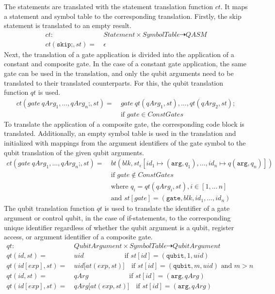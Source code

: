 The statements are translated with the statement translation function $ct$. It maps a statement and symbol table to the corresponding translation. Firstly, the skip statement is translated to an empty result.
\begin{align*}
    ct : \ & Statement \times SymbolTable \dashrightarrow QASM\\
    ct(\texttt{skip;}, st) = \ & \epsilon
\end{align*}
Next, the translation of a gate application is divided into the application of a constant and composite gate. In the case of a constant gate application, the same gate can be used in the translation, and only the qubit arguments need to be translated to their translated counterparts. For this, the qubit translation function $qt$ is used.
\begin{align*}
    ct(gate \ qArg_1, \dots, qArg_n\texttt{;}, st) = \ & gate \ qt(qArg_1, st), \dots, qt(qArg_2, st); \\
                                                       & \text{if } gate \in ConstGates
\end{align*}
To translate the application of a composite gate, the corresponding code block is translated. Additionally, an empty symbol table is used in the translation and initialized with mappings from the argument identifiers of the gate symbol to the qubit translation of the given qubit arguments.
\begin{align*}
    ct(gate \ qArg_1, \dots, qArg_n\texttt{;}, st) = \ & bt(blk, st_\epsilon[id_1 \mapsto (\texttt{arg}, q_1), \dots, id_n \mapsto q(\texttt{arg}, q_n)]) \\
        &\text{if } gate \not\in ConstGates\\
        &\text{where } q_i = qt(qArg_i, st), i \in [1, ...\, n]\\
        &\text{and } st[gate] = (\texttt{gate}, blk, id_1, \dots, id_n)
\end{align*}
The qubit translation function $qt$ is used to translate the identifier of a gate argument or control qubit, in the case of if-statements, to the corresponding unique identifier regardless of whether the qubit argument is a qubit, register access, or argument identifier of a composite gate. 
\begin{align*}
    qt :\ & \displaystyle QubitArgument \times SymbolTable \dashrightarrow QubitArgument\\
    qt(id, st) = \ & uid \quad\quad\quad\quad\quad\quad \text{if } st[id] = (\texttt{qubit}, 1, uid)\\
    qt(id[exp], st) = \ & uid\texttt{[}at(exp, st)\texttt{]} \quad \text{if } st[id] = (\texttt{qubit}, m, uid) \text{ and } m > n\\
    qt(id, st) = \ & qArg \quad\quad\quad\quad\quad\quad \text{if } st[id] = (\texttt{arg}, qArg)\\
    qt(id[exp], st) = \ & qArg\texttt{[}at(exp, st)\texttt{]} \quad \text{if } st[id] = (\texttt{arg}, qArg)
\end{align*}

